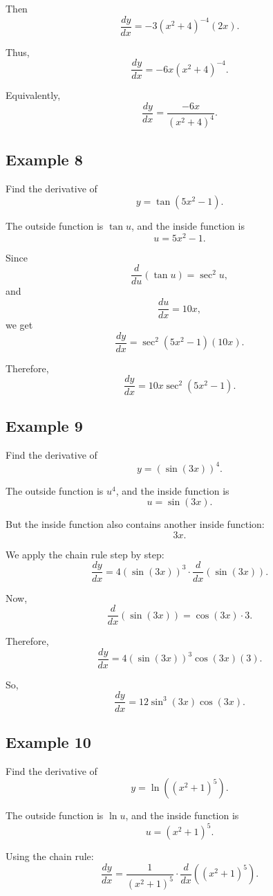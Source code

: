 \documentclass[12pt]{article}
\begin{document}
	Then
	\[
	\frac{dy}{dx}
	=
	-3(x^2+4)^{-4}(2x).
	\]
	
	Thus,
	\[
	\boxed{\frac{dy}{dx}=-6x(x^2+4)^{-4}.}
	\]
	
	Equivalently,
	\[
	\boxed{\frac{dy}{dx}=\frac{-6x}{(x^2+4)^4}.}
	\]
	
	\subsection*{Example 8}
	
	Find the derivative of
	\[
	y=\tan(5x^2-1).
	\]
	
	The outside function is \(\tan u\), and the inside function is
	\[
	u=5x^2-1.
	\]
	
	Since
	\[
	\frac{d}{du}(\tan u)=\sec^2 u,
	\]
	and
	\[
	\frac{du}{dx}=10x,
	\]
	we get
	\[
	\frac{dy}{dx}=\sec^2(5x^2-1)(10x).
	\]
	
	Therefore,
	\[
	\boxed{\frac{dy}{dx}=10x\sec^2(5x^2-1).}
	\]
	
	\subsection*{Example 9}
	
	Find the derivative of
	\[
	y=(\sin(3x))^4.
	\]
	
	The outside function is \(u^4\), and the inside function is
	\[
	u=\sin(3x).
	\]
	
	But the inside function also contains another inside function:
	\[
	3x.
	\]
	
	We apply the chain rule step by step:
	\[
	\frac{dy}{dx}
	=
	4(\sin(3x))^3 \cdot \frac{d}{dx}(\sin(3x)).
	\]
	
	Now,
	\[
	\frac{d}{dx}(\sin(3x))=\cos(3x)\cdot 3.
	\]
	
	Therefore,
	\[
	\frac{dy}{dx}
	=
	4(\sin(3x))^3 \cos(3x)(3).
	\]
	
	So,
	\[
	\boxed{\frac{dy}{dx}=12\sin^3(3x)\cos(3x).}
	\]
	
	\subsection*{Example 10}
	
	Find the derivative of
	\[
	y=\ln\left((x^2+1)^5\right).
	\]
	
	The outside function is \(\ln u\), and the inside function is
	\[
	u=(x^2+1)^5.
	\]
	
	Using the chain rule:
	\[
	\frac{dy}{dx}
	=
	\frac{1}{(x^2+1)^5}\cdot \frac{d}{dx}\left((x^2+1)^5\right).
	\]
	
\end{document}
